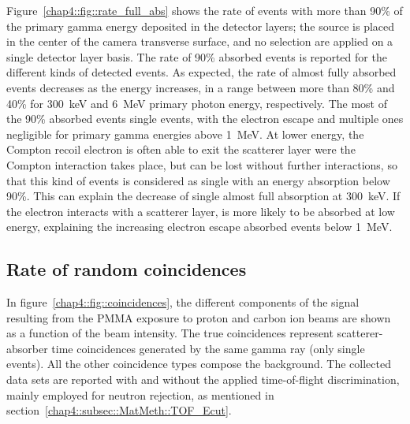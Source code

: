 Figure~\ref{chap4::fig::rate_full_abs} shows the rate of events with more than 90\% of the primary gamma energy deposited in the detector layers; the source is placed in the center of the camera transverse surface, and no selection are applied on a single detector layer basis. The rate of 90\% absorbed events is reported for the different kinds of detected events. As expected, the rate of almost fully absorbed events decreases as the energy increases, in a range between more than 80\% and 40\% for 300~keV and 6~MeV primary photon energy, respectively. The most of the 90\% absorbed events single events, with the electron escape and multiple ones negligible for primary gamma energies above 1~MeV. At lower energy, the Compton recoil electron is often able to exit the scatterer layer were the Compton interaction takes place, but can be lost without further interactions, so that this kind of events is considered as single with an energy absorption below 90\%. This can explain the decrease of single almost full absorption at 300~keV. If the electron interacts with a scatterer layer, is more likely to be absorbed at low energy, explaining the increasing electron escape absorbed events below 1~MeV.  
 
\subsection{Rate of random coincidences}\label{chap4::subsec::Results::beamInt}
 
In figure~\ref{chap4::fig::coincidences}, the different components of the signal resulting from the PMMA exposure to proton and carbon ion beams are shown as a function of the beam intensity. The true coincidences represent scatterer-absorber time coincidences generated by the same gamma ray (only single events). All the other coincidence types compose the background. The collected data sets are reported with and without the applied time-of-flight discrimination, mainly employed for neutron rejection, as mentioned in section~\ref{chap4::subsec::MatMeth::TOF_Ecut}.



